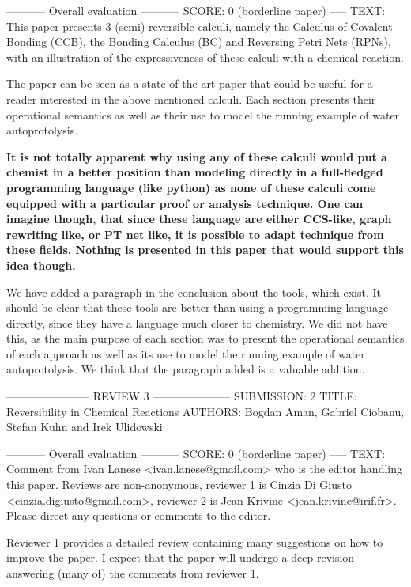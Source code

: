 \documentclass{article}
\begin{document}
----------- Overall evaluation -----------
SCORE: 0 (borderline paper)
----- TEXT:
This paper presents 3 (semi) reversible calculi, namely the Calculus of Covalent Bonding (CCB), the Bonding Calculus (BC) and Reversing Petri Nets (RPNs), with an illustration of the expressiveness of these calculi with a chemical reaction.

The paper can be seen as a state of the art paper that could be useful for a reader interested in the above mentioned calculi. Each section presents their operational semantics as well as their use to model the running example of water autoprotolysis.

\textbf{It is not totally apparent why using any of these calculi would put a chemist in a better position than modeling directly in a full-fledged programming language (like python) as none of these calculi come equipped with a particular proof or analysis technique.  One can imagine though, that since these language are either CCS-like, graph rewriting like, or PT net like, it is possible to adapt technique from these fields. Nothing is presented in this paper that would support this idea though.}

We have added a paragraph in the conclusion about the tools, which exist. It should be clear that these tools are better than using a programming language directly, since they have a language much closer to chemistry. We did not have this, as the main purpose of each section was to present the operational semantics of each approach as well as its use to model the running example of water autoprotolysis. We think that the paragraph added is a valuable addition. 

----------------------- REVIEW 3 ---------------------
SUBMISSION: 2
TITLE: Reversibility in Chemical Reactions
AUTHORS: Bogdan Aman, Gabriel Ciobanu, Stefan Kuhn and Irek Ulidowski

----------- Overall evaluation -----------
SCORE: 0 (borderline paper)
----- TEXT:
Comment from Ivan Lanese <ivan.lanese@gmail.com> who is the editor handling this paper. Reviews are non-anonymous, reviewer 1 is Cinzia Di Giusto <cinzia.digiusto@gmail.com>, reviewer 2 is Jean Krivine <jean.krivine@irif.fr>. Please direct any questions or comments to the editor.

Reviewer 1 provides a detailed review containing many suggestions on how to improve the paper. I expect that the paper will undergo a deep revision answering (many of) the comments from reviewer 1.
\end{document}
